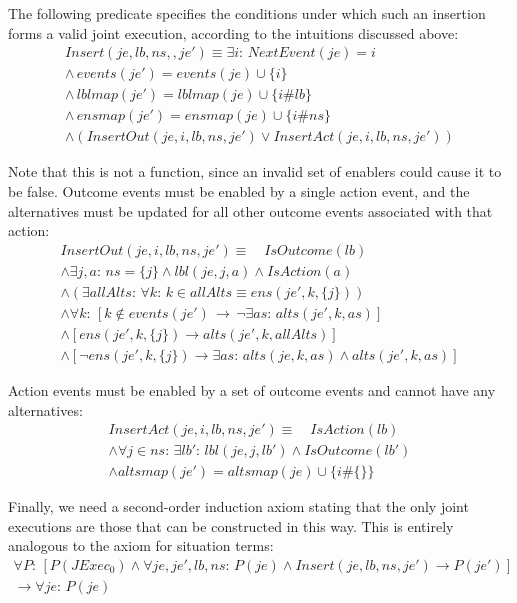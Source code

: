 The following predicate specifies the conditions under which such
an insertion forms a valid joint execution, according to the intuitions
discussed above:\begin{gather*}
Insert(je,lb,ns,,je')\equiv\exists i:\, NextEvent(je)=i\\
\wedge\, events(je')=events(je)\cup\{i\}\\
\wedge\, lblmap(je')=lblmap(je)\cup\{i\#lb\}\\
\wedge\, ensmap(je')=ensmap(je)\cup\{i\#ns\}\\
\wedge\left(InsertOut(je,i,lb,ns,je')\vee InsertAct(je,i,lb,ns,je')\right)\end{gather*}


Note that this is not a function, since an invalid set of enablers
could cause it to be false. Outcome events must be enabled by a single
action event, and the alternatives must be updated for all other outcome
events associated with that action:\begin{gather*}
InsertOut(je,i,lb,ns,je')\equiv\,\,\,\,\,\, IsOutcome(lb)\\
\wedge\exists j,a:\, ns=\{j\}\wedge lbl(je,j,a)\wedge IsAction(a)\\
\wedge\left(\exists allAlts:\,\forall k:\, k\in allAlts\equiv ens(je',k,\{j\})\right)\\
\wedge\forall k:\,\left[k\not\in events(je')\,\rightarrow\,\neg\exists as:\, alts(je',k,as)\right]\\
\wedge\left[ens(je',k,\{j\})\rightarrow alts(je',k,allAlts)\right]\\
\wedge\left[\neg ens(je',k,\{j\})\rightarrow\exists as:\, alts(je,k,as)\wedge alts(je',k,as)\right]\end{gather*}


Action events must be enabled by a set of outcome events and cannot
have any alternatives:\begin{gather*}
InsertAct(je,i,lb,ns,je')\equiv\,\,\,\,\,\, IsAction(lb)\\
\wedge\forall j\in ns:\,\exists lb':\, lbl(je,j,lb')\wedge IsOutcome(lb')\\
\wedge altsmap(je')=altsmap(je)\cup\{i\#\{\}\}\end{gather*}


Finally, we need a second-order induction axiom stating that the only
joint executions are those that can be constructed in this way. This
is entirely analogous to the axiom for situation terms:\begin{multline*}
\forall P:\,\left[P(JExec_{0})\wedge\forall je,je',lb,ns:\, P(je)\wedge Insert(je,lb,ns,je')\rightarrow P(je')\right]\\
\rightarrow\forall je:\, P(je)\end{multline*}



